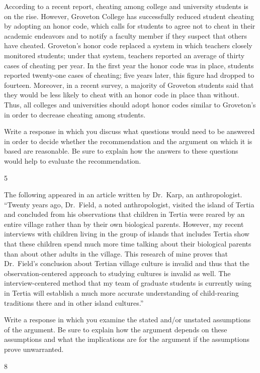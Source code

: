\documentclass[]{article}
\begin{document}
According to a recent report, cheating among college and university
students is on the rise. However, Groveton College has successfully
reduced student cheating by adopting an honor code, which calls for
students to agree not to cheat in their academic endeavors and to notify
a faculty member if they suspect that others have cheated. Groveton's
honor code replaced a system in which teachers closely monitored
students; under that system, teachers reported an average of thirty
cases of cheating per year. In the first year the honor code was in
place, students reported twenty-one cases of cheating; five years later,
this figure had dropped to fourteen. Moreover, in a recent survey, a
majority of Groveton students said that they would be less likely to
cheat with an honor code in place than without. Thus, all colleges and
universities should adopt honor codes similar to Groveton's in order to
decrease cheating among students.

Write a response in which you discuss what questions would need to be
answered in order to decide whether the recommendation and the argument
on which it is based are reasonable. Be sure to explain how the answers
to these questions would help to evaluate the recommendation.

5

The following appeared in an article written by Dr.~Karp, an
anthropologist. ``Twenty years ago, Dr.~Field, a noted anthropologist,
visited the island of Tertia and concluded from his observations that
children in Tertia were reared by an entire village rather than by their
own biological parents. However, my recent interviews with children
living in the group of islands that includes Tertia show that these
children spend much more time talking about their biological parents
than about other adults in the village. This research of mine proves
that Dr.~Field's conclusion about Tertian village culture is invalid and
thus that the observation-centered approach to studying cultures is
invalid as well. The interview-centered method that my team of graduate
students is currently using in Tertia will establish a much more
accurate understanding of child-rearing traditions there and in other
island cultures.''

Write a response in which you examine the stated and/or unstated
assumptions of the argument. Be sure to explain how the argument depends
on these assumptions and what the implications are for the argument if
the assumptions prove unwarranted.

8
\end{document}

